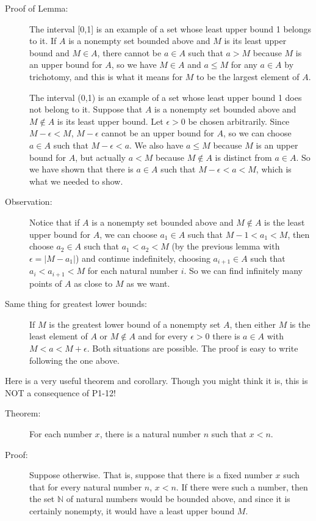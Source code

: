 \documentclass[12pt]{article}
\begin{document}
\begin{description}
\begin{description}
\item[Proof of Lemma:]   The interval [0,1] is an example of a set whose least upper bound 1 belongs to it.   If $A$ is a nonempty set bounded above and $M$ is its least upper bound and $M \in A$, there cannot be $a \in A$ such that $a>M$ because $M$ is an upper bound for $A$, so we have $M \in A$ and $a \leq M$ for any $a \in A$ by trichotomy, and this is what it means for $M$ to be the largest element of $A$.

The interval (0,1) is an example of a set whose least upper bound 1 does not belong to it.  Suppose that $A$ is a nonempty set bounded above and $M \not\in A$ is its least upper bound.
Let $\epsilon>0$ be chosen arbitrarily.   Since $M-\epsilon<M$, $M-\epsilon$ cannot be an upper bound for $A$, so we can choose $a \in A$ such that $M-\epsilon<a$.  We   also have $a \leq M$ because $M$ is an upper bound for $A$, but actually $a<M$ because $M \not\in A$ is distinct from $a \in A$.  So we have shown that there is $a \in A$ such that
$M-\epsilon < a <M$, which is what we needed to show.

\item[Observation:]  Notice that if $A$ is a nonempty set bounded above and $M \not\in A$ is the least upper bound for $A$, we can choose $a_1 \in A$ such that  $M-1<a_1<M$,
then choose $a_2\in A$ such that $a_1 < a_2 < M$ (by the previous lemma with $\epsilon = |M-a_1|$) and continue indefinitely, choosing $a_{i+1} \in A$ such that
$a_i < a_{i+1}<M$ for each natural number $i$.  So we can find infinitely many points of $A$ as close to $M$ as we want.

\item[Same thing for greatest lower bounds:]  If $M$ is the greatest lower bound of a nonempty set $A$, then either $M$ is the least element of $A$ or
$M \not\in A$ and for every $\epsilon>0$ there is $a \in A$ with $M < a <M+\epsilon$.   Both situations are possible.  The proof is easy to write following the one above.


\end{description}

Here is a very useful theorem and corollary.  Though you might think it is, this is NOT a consequence of P1-12!

\begin{description}


\item[Theorem:]  For each number $x$, there is a natural number $n$ such that $x < n$.

\item[Proof:]   Suppose otherwise.   That is, suppose that there is a fixed number $x$ such that for every natural number $n$, $x<n$.   If there were such a number, then the
set $\mathbb N$ of natural numbers would be bounded above, and since it is certainly nonempty, it would have a least upper bound $M$.


\end{description}
\end{description}
\end{document}
